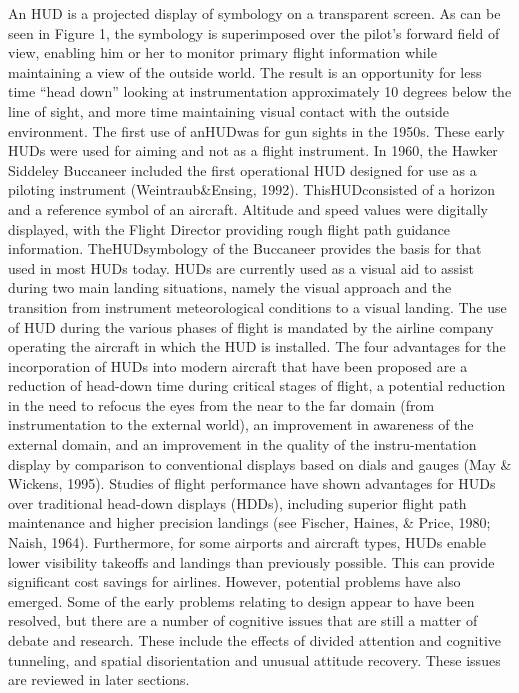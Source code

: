 \documentclass[utf8,bachelor,manualbib]{gradu3}
\begin{document}
An HUD is a projected display of symbology on a transparent screen. As can be
seen in Figure 1, the symbology is superimposed over the pilot’s forward field
of view, enabling him or her to monitor primary flight information while maintaining
a view of the outside world. The result is an opportunity for less time
“head down” looking at instrumentation approximately 10 degrees below the line of
sight, and more time maintaining visual contact with the outside environment.
The first use of anHUDwas for gun sights in the 1950s. These early HUDs were
used for aiming and not as a flight instrument. In 1960, the Hawker Siddeley Buccaneer
included the first operational HUD designed for use as a piloting instrument
(Weintraub\&Ensing, 1992). ThisHUDconsisted of a horizon and a reference symbol
of an aircraft. Altitude and speed values were digitally displayed, with the Flight
Director providing rough flight path guidance information. TheHUDsymbology of
the Buccaneer provides the basis for that used in most HUDs today.
HUDs are currently used as a visual aid to assist during two main landing situations,
namely the visual approach and the transition from instrument meteorological
conditions to a visual landing. The use of HUD during the various phases of
flight is mandated by the airline company operating the aircraft in which the HUD
is installed. The four advantages for the incorporation of HUDs into modern aircraft
that have been proposed are a reduction of head-down time during critical
stages of flight, a potential reduction in the need to refocus the eyes from the near
to the far domain (from instrumentation to the external world), an improvement in
awareness of the external domain, and an improvement in the quality of the instru-mentation display by comparison to conventional displays based on dials and
gauges (May \& Wickens, 1995).
Studies of flight performance have shown advantages for HUDs over traditional
head-down displays (HDDs), including superior flight path maintenance
and higher precision landings (see Fischer, Haines, \& Price, 1980; Naish, 1964).
Furthermore, for some airports and aircraft types, HUDs enable lower visibility
takeoffs and landings than previously possible. This can provide significant cost
savings for airlines. However, potential problems have also emerged. Some of the
early problems relating to design appear to have been resolved, but there are a
number of cognitive issues that are still a matter of debate and research. These include
the effects of divided attention and cognitive tunneling, and spatial disorientation
and unusual attitude recovery. These issues are reviewed in later sections. \citep{crawford2006}
\end{document}
